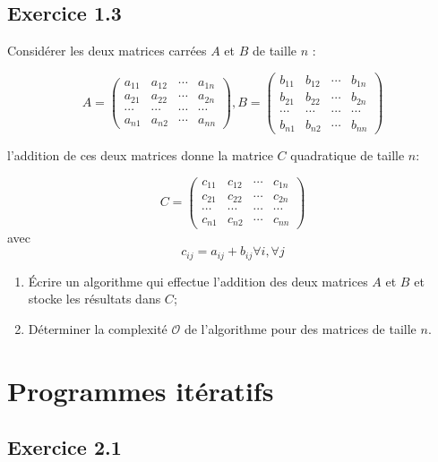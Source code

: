 \documentclass{article}[12pt]
\begin{document}
\subsection*{Exercice 1.3}

Considérer les deux matrices carrées $A$ et $B$ de taille $n$ :

\[
  A = 
  \begin{pmatrix}
    a_{11} & a_{12} & \cdots & a_{1n}\\
    a_{21} & a_{22} & \cdots & a_{2n}\\
    \cdots & \cdots & \cdots & \cdots\\
    a_{n1} & a_{n2} &\cdots & a_{nn}
  \end{pmatrix}
  , B = 
  \begin{pmatrix}
    b_{11} & b_{12} & \cdots & b_{1n}\\
    b_{21} & b_{22} & \cdots & b_{2n}\\
    \cdots & \cdots & \cdots & \cdots\\
    b_{n1} & b_{n2} &\cdots & b_{nn}
  \end{pmatrix}
\]

l'addition de ces deux matrices donne la matrice $C$ quadratique de taille $n$:

\[
  C = 
  \begin{pmatrix}
    c_{11} & c_{12} & \cdots & c_{1n}\\
    c_{21} & c_{22} & \cdots & c_{2n}\\
    \cdots & \cdots & \cdots & \cdots\\
    c_{n1} & c_{n2} &\cdots & c_{nn}
  \end{pmatrix}
\]
avec
\begin{equation*}
    c_{ij} = a_{ij} + b_{ij} \forall i, \forall j
\end{equation*}

\begin{enumerate}
    \item Écrire un algorithme qui effectue l'addition des deux matrices $A$ et $B$ et stocke les résultats dans $C$;
    \item Déterminer la complexité $\mathcal{O}$ de l'algorithme pour des matrices de taille $n$.
\end{enumerate}

\section{Programmes itératifs}

\subsection*{Exercice 2.1}
\end{document}
